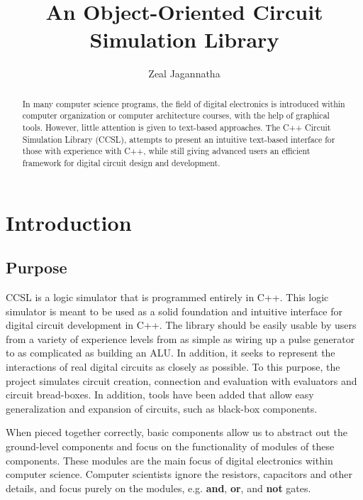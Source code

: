 \documentclass{article}
\newcommand{\Bold}[1]{\textbf{#1}}
\begin{document}
\title{An Object-Oriented Circuit Simulation Library}
\author{Zeal Jagannatha}

\maketitle

\begin{abstract}

In many computer science programs, the field of digital electronics is introduced within computer organization or computer architecture courses, with the help of graphical tools. However, little attention is given to text-based approaches. The C++ Circuit Simulation Library (CCSL), attempts to present an intuitive text-based interface for those with experience with C++, while still giving advanced users an efficient framework for digital circuit design and development.

\end{abstract}

\section{Introduction}

\subsection{Purpose}

CCSL is a logic simulator that is programmed entirely in C++. This logic simulator is meant to be used as a solid foundation and intuitive interface for digital circuit development in C++. The library should be easily usable by users from a variety of experience levels from as simple as wiring up a pulse generator to as complicated as building an ALU. In addition, it seeks to represent the interactions of real digital circuits as closely as possible. To this purpose, the project simulates circuit creation, connection and evaluation with evaluators and circuit bread-boxes. In addition, tools have been added that allow easy generalization and expansion of circuits, such as black-box components.

When pieced together correctly, basic components allow us to abstract out the ground-level components and focus on the functionality of modules of these components. These modules are the main focus of digital electronics within computer science. Computer scientists ignore the resistors, capacitors and other details, and focus purely on the modules, e.g. \Bold{and}, \Bold{or}, and \Bold{not} gates.
\end{document}
